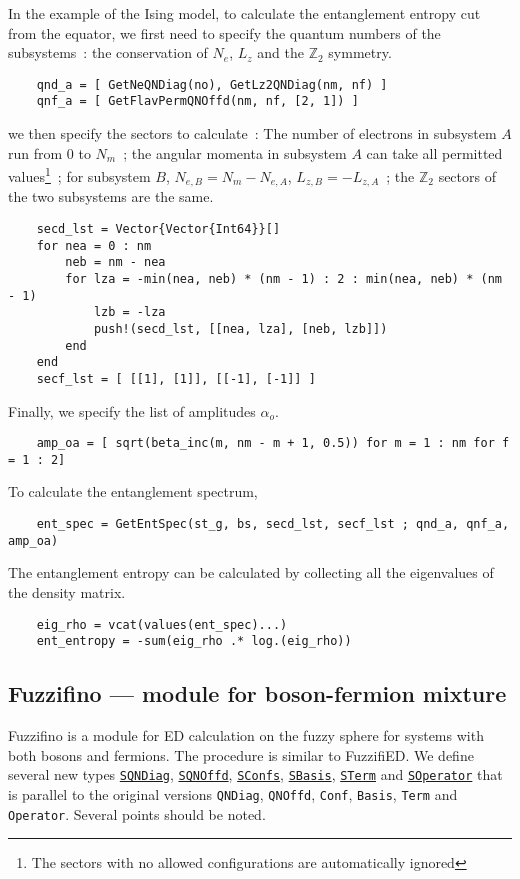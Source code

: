 \documentclass{timesjhep}
\begin{document}
In the example of the Ising model, to calculate the entanglement entropy cut from the equator, we first need to specify the quantum numbers of the subsystems~: the conservation of $N_e$, $L_z$ and the $\mathbb{Z}_2$ symmetry.
\begin{lstlisting}
    qnd_a = [ GetNeQNDiag(no), GetLz2QNDiag(nm, nf) ]
    qnf_a = [ GetFlavPermQNOffd(nm, nf, [2, 1]) ]
\end{lstlisting}
we then specify the sectors to calculate~: The number of electrons in subsystem $A$ run from $0$ to $N_m$~; the angular momenta in subsystem $A$ can take all permitted values\footnote{The sectors with no allowed configurations are automatically ignored}~; for subsystem $B$, $N_{e,B}=N_m-N_{e,A}$, $L_{z,B}=-L_{z,A}$~; the $\mathbb{Z}_2$ sectors of the two subsystems are the same. 
\begin{lstlisting}
    secd_lst = Vector{Vector{Int64}}[]
    for nea = 0 : nm 
        neb = nm - nea 
        for lza = -min(nea, neb) * (nm - 1) : 2 : min(nea, neb) * (nm - 1)
            lzb = -lza 
            push!(secd_lst, [[nea, lza], [neb, lzb]])
        end
    end
    secf_lst = [ [[1], [1]], [[-1], [-1]] ]
\end{lstlisting}
Finally, we specify the list of amplitudes $\alpha_o$.
\begin{lstlisting}
    amp_oa = [ sqrt(beta_inc(m, nm - m + 1, 0.5)) for m = 1 : nm for f = 1 : 2]
\end{lstlisting}
To calculate the entanglement spectrum, 
\begin{lstlisting}
    ent_spec = GetEntSpec(st_g, bs, secd_lst, secf_lst ; qnd_a, qnf_a, amp_oa)
\end{lstlisting}
The entanglement entropy can be calculated by collecting all the eigenvalues of the density matrix.
\begin{lstlisting}
    eig_rho = vcat(values(ent_spec)...)
    ent_entropy = -sum(eig_rho .* log.(eig_rho))
\end{lstlisting}

\subsection{Fuzzifino --- module for boson-fermion mixture}
\label{sec:ed_fuzzifino}

Fuzzifino is a module for ED calculation on the fuzzy sphere for systems with both bosons and fermions. The procedure is similar to FuzzifiED. We define several new types \href{https://docs.fuzzified.world/fuzzifino/\#FuzzifiED.Fuzzifino.SQNDiag}{\lstinline|SQNDiag|}, \href{https://docs.fuzzified.world/fuzzifino/\#FuzzifiED.Fuzzifino.SQNOffd}{\lstinline|SQNOffd|}, \href{https://docs.fuzzified.world/fuzzifino/\#FuzzifiED.Fuzzifino.SConfs}{\lstinline|SConfs|}, \href{https://docs.fuzzified.world/fuzzifino/\#FuzzifiED.Fuzzifino.SBasis}{\lstinline|SBasis|}, \href{https://docs.fuzzified.world/fuzzifino/\#FuzzifiED.Fuzzifino.STerm}{\lstinline|STerm|} and \href{https://docs.fuzzified.world/fuzzifino/\#FuzzifiED.Fuzzifino.SOperator}{\lstinline|SOperator|} that is parallel to the original versions \lstinline|QNDiag|, \lstinline|QNOffd|, \lstinline|Conf|, \lstinline|Basis|, \lstinline|Term| and \lstinline|Operator|. Several points should be noted.
\end{document}
